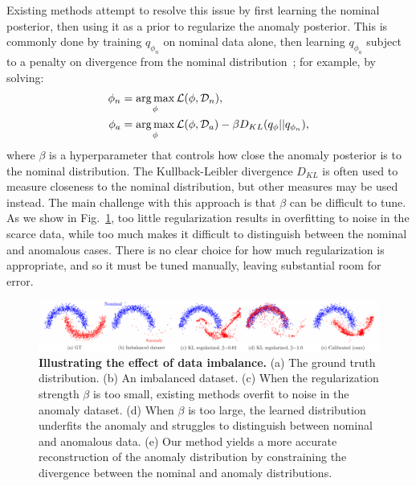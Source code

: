 Existing methods attempt to resolve this issue by first learning the nominal posterior, then using it as a prior to regularize the anomaly posterior. This is commonly done by training $q_{\phi_n}$ on nominal data alone, then learning $q_{\phi_a}$ subject to a penalty on divergence from the nominal distribution~\cite{asimInvertibleGenerativeModels2020,higginsBetaVAELearningBasic2016}; for example, by solving:
%
\begin{align}
    \phi_{n} & = \operatorname*{arg\,max}_\phi \mathcal{L}(\phi, \mathcal{D}_n),                                                                                 \\
    \phi_{a} & = \operatorname*{arg\,max}_\phi \mathcal{L}(\phi, \mathcal{D}_a) - \beta D_{KL}(q_{\phi} || q_{\phi_{n}}), \label{ch:icml:eq:elbo_kl_regularized}
\end{align}
where $\beta$ is a hyperparameter that controls how close the anomaly posterior is to the nominal distribution. The Kullback-Leibler divergence $D_{KL}$ is often used to measure closeness to the nominal distribution, but other measures may be used instead. The main challenge with this approach is that $\beta$ can be difficult to tune. As we show in Fig.~\ref{ch:icml:fig:toy_example}, too little regularization results in overfitting to noise in the scarce data, while too much makes it difficult to distinguish between the nominal and anomalous cases. There is no clear choice for how much regularization is appropriate, and so it must be tuned manually, leaving substantial room for error.

\begin{figure}[ht]
    \centering
    \includegraphics[width=\textwidth]{images/icml/toy_results_overview.pdf}
    \caption{\textbf{Illustrating the effect of data imbalance.} (a) The ground truth distribution. (b) An imbalanced dataset. (c) When the regularization strength $\beta$ is too small, existing methods overfit to noise in the anomaly dataset. (d) When $\beta$ is too large, the learned distribution underfits the anomaly and struggles to distinguish between nominal and anomalous data. (e) Our method yields a more accurate reconstruction of the anomaly distribution by constraining the divergence between the nominal and anomaly distributions.}
    \label{ch:icml:fig:toy_example}
\end{figure}

